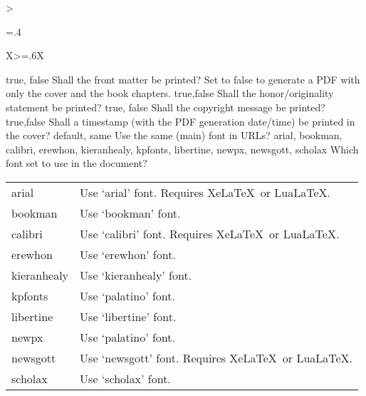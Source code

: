 \begin{xltabular}{\linewidth}{>{\hsize=.4\hsize\raggedright\arraybackslash}X>{\hsize=.6\hsize}X}
	    \midrule
  	  	{true, \newline false}%
	    {Shall the front matter be printed?}%
		{Set to false to generate a PDF with only the cover and the book chapters.}
	    \midrule
  	  	{true,\newline false }%
	    {Shall the honor/originality statement be printed?}%
		{}
	    \midrule
  	  	{true, \newline false}%
	    {Shall the copyright message be printed?}%
		{}
	    \midrule
  	  	{true,\newline false}%
	    {Shall a timestamp (with the PDF generation date/time) be printed in the cover?}%
		{%
		}
	    \midrule
  	  	{default, \newline same}%
	    {Use the same (main) font in URLs?}%
		{}
    \midrule
    {arial, bookman, calibri, erewhon, kieranhealy, kpfonts, libertine, newpx, newsgott, scholax}%
    {Which font set to use in the document?}%
	{%
    \begin{tabular}{@{}l@{ $\rightarrow$ }X@{}}
		arial 		& Use `arial' font. Requires Xe\LaTeX\ or Lua\LaTeX.\\
		bookman 	& Use `bookman' font.\\
		calibri 	& Use `calibri' font. Requires Xe\LaTeX\ or Lua\LaTeX.\\
		erewhon 	& Use `erewhon' font.\\
		kieranhealy & Use `kieranhealy' font.\\
		kpfonts 	& Use `palatino' font.\\
		libertine 	& Use `libertine' font.\\
		newpx 		& Use `palatino' font. \\
		newsgott 	& Use `newsgott' font. Requires Xe\LaTeX\ or Lua\LaTeX.\\
		scholax 	& Use `scholax' font.\\

\end{tabular}}
\end{xltabular}
